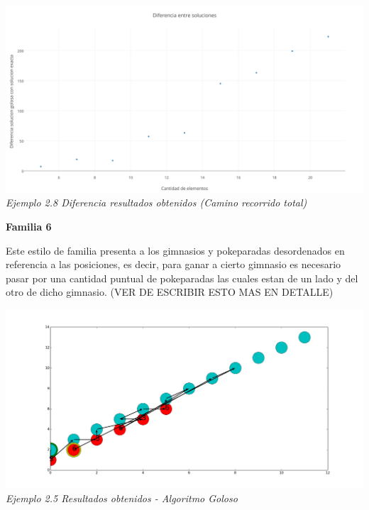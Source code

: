 \vspace*{0.3cm} \vspace*{0.3cm}
  \begin{center}
\includegraphics[scale=0.5]{./EJ2/Diferenciagym0.png}
\\{\textit{Ejemplo 2.8 Diferencia resultados obtenidos (Camino recorrido total) }}
  \end{center}
  \vspace*{0.3cm}


\begin{center}
\textbf{Familia 6}
\end{center}

Este estilo de familia presenta a los gimnasios y pokeparadas desordenados en referencia a las posiciones, es decir, para ganar a cierto gimnasio es necesario pasar por una cantidad puntual de pokeparadas las cuales estan de un lado y del otro de dicho gimnasio.
(VER DE ESCRIBIR ESTO MAS EN DETALLE)

\vspace*{0.3cm} \vspace*{0.3cm}
  \begin{center}
\includegraphics[scale=0.40]{./EJ2/caminosinorden1.png}
\\{\textit{Ejemplo 2.5 Resultados obtenidos - Algoritmo Goloso}}
  \end{center}
  \vspace*{0.3cm}
  
